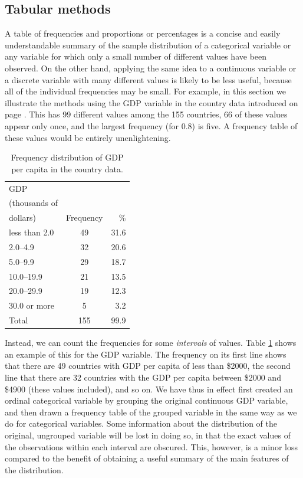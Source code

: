 \subsection{Tabular methods}
\label{ss_descr1_1cont_tab}

A table of frequencies and proportions or percentages is a concise and
easily understandable summary of the sample distribution of a
categorical variable or any variable for which only a small number
of different values have been observed. On the other hand, applying the
same idea to a continuous variable or a discrete variable with many
different values is likely to be less useful, because all of the
individual frequencies may be small. For example, in this section we
illustrate the methods using the GDP variable in the country data
introduced on page \pageref{country_example}. This has 99 different
values among the 155 countries, 66 of these values appear only once, and
the largest frequency (for 0.8) is five. A frequency table of these
values would be entirely unenlightening.

\begin{table}
\caption{Frequency distribution of
GDP per capita in the country
data.}
\label{t_gdp}
\begin{center}
\begin{tabular}{|l|cr|}\hline
GDP & & \\
(thousands of& & \\
dollars) & Frequency & \% \\
\hline
less than 2.0 & 49 & 31.6\\
2.0--4.9 & 32 & 20.6\\
5.0--9.9 & 29 & 18.7\\
10.0--19.9 & 21 & 13.5\\
20.0--29.9 & 19 & 12.3\\
30.0 or more & 5 & 3.2\\
\hline
Total & 155 & 99.9 \\
\hline
\end{tabular}
\end{center}
\end{table}

Instead, we can count the frequencies for some \emph{intervals} of
values. Table \ref{t_gdp} shows an example of this for the GDP variable.
The frequency on its first line shows that there are 49 countries with
GDP per capita of less than \$2000, the second line that there are 32
countries with the GDP per capita between \$2000 and \$4900 (these
values included), and so on. We have thus in effect first created an
ordinal categorical variable by grouping the original continuous GDP
variable, and then drawn a frequency table of the grouped variable in
the same way as we do for categorical variables. Some information about
the distribution of the original, ungrouped variable will be lost in
doing so, in that the exact values of the observations within each
interval are obscured. This, however, is a minor loss compared to the
benefit of obtaining a useful summary of the main features of the
distribution.

